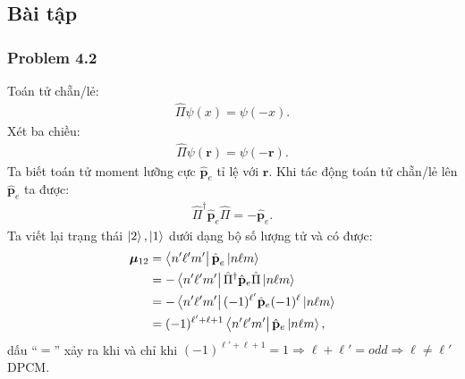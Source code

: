 \documentclass{report}
\renewcommand{\l}{\ell}
\begin{document}
\subsection{Bài tập}
\subsubsection*{Problem 4.2}
Toán tử chẵn/lẻ:
\begin{align*}
	\hat{\Pi} \psi(x) = \psi(-x).
\end{align*}
Xét ba chiều:
\begin{align*}
	\hat{\Pi} \psi(\mathbf{r}) = \psi(-\mathbf{r}).
\end{align*}
Ta biết toán tử moment lưỡng cực $\hat{\textbf{p}}_e$ tỉ lệ với $\mathbf{r}$. Khi tác động toán tử chẵn/lẻ lên $\hat{\textbf{p}}_e$ ta được:
\begin{align*}
	\hat{\Pi}^{\dagger} \hat{\textbf{p}}_e \hat{\Pi} = - \hat{\textbf{p}}_e.
\end{align*}
Ta viết lại trạng thái $\ket{2},\ket{1}$ dưới dạng bộ số lượng tử và có được:
\begin{align*}
	\boldsymbol{\mu}_{12}
	& = \bra{n'\l'm'} \hat{\textbf{p}}_e \ket{n\l m}                                   \\
	& =  - \bra{n'\l'm'}  \hat{\Pi}^{\dagger} \hat{\mathbf{p}}_e \hat{\Pi} \ket{n\l m} \\
	& =  - \bra{n'\l'm'}  (-1)^{\l'} \hat{\mathbf{p}}_e (-1)^{\l} \ket{n\l m}          \\
	& =(-1)^{\l' + \l + 1} \bra{n'\l'm'}   \hat{\mathbf{p}}_e \ket{n\l m},
\end{align*}
dấu ``$=$'' xảy ra khi và chỉ khi $ (-1)^{\l' + \l + 1} = 1 \Rightarrow \l + \l' = odd \Rightarrow \l \neq \l'$ DPCM.
\end{document}
